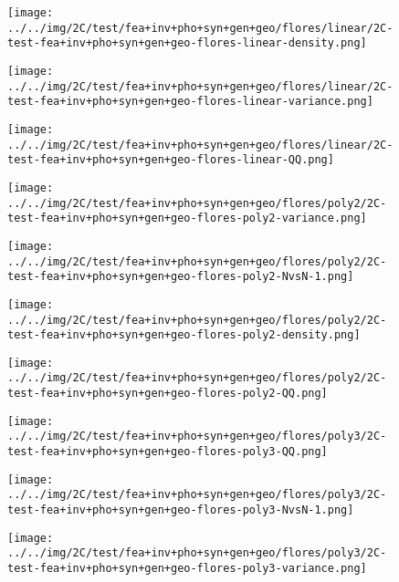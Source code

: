 \begin{figure}[H]
\centering	\texttt{[image: ../../img/2C/test/fea+inv+pho+syn+gen+geo/flores/linear/2C-test-fea+inv+pho+syn+gen+geo-flores-linear-density.png]}
\end{figure}
\begin{figure}[H]
\centering	\texttt{[image: ../../img/2C/test/fea+inv+pho+syn+gen+geo/flores/linear/2C-test-fea+inv+pho+syn+gen+geo-flores-linear-variance.png]}
\end{figure}
\begin{figure}[H]
\centering	\texttt{[image: ../../img/2C/test/fea+inv+pho+syn+gen+geo/flores/linear/2C-test-fea+inv+pho+syn+gen+geo-flores-linear-QQ.png]}
\end{figure}
\begin{figure}[H]
\centering	\texttt{[image: ../../img/2C/test/fea+inv+pho+syn+gen+geo/flores/poly2/2C-test-fea+inv+pho+syn+gen+geo-flores-poly2-variance.png]}
\end{figure}
\begin{figure}[H]
\centering	\texttt{[image: ../../img/2C/test/fea+inv+pho+syn+gen+geo/flores/poly2/2C-test-fea+inv+pho+syn+gen+geo-flores-poly2-NvsN-1.png]}
\end{figure}
\begin{figure}[H]
\centering	\texttt{[image: ../../img/2C/test/fea+inv+pho+syn+gen+geo/flores/poly2/2C-test-fea+inv+pho+syn+gen+geo-flores-poly2-density.png]}
\end{figure}
\begin{figure}[H]
\centering	\texttt{[image: ../../img/2C/test/fea+inv+pho+syn+gen+geo/flores/poly2/2C-test-fea+inv+pho+syn+gen+geo-flores-poly2-QQ.png]}
\end{figure}
\begin{figure}[H]
\centering	\texttt{[image: ../../img/2C/test/fea+inv+pho+syn+gen+geo/flores/poly3/2C-test-fea+inv+pho+syn+gen+geo-flores-poly3-QQ.png]}
\end{figure}
\begin{figure}[H]
\centering	\texttt{[image: ../../img/2C/test/fea+inv+pho+syn+gen+geo/flores/poly3/2C-test-fea+inv+pho+syn+gen+geo-flores-poly3-NvsN-1.png]}
\end{figure}
\begin{figure}[H]
\centering	\texttt{[image: ../../img/2C/test/fea+inv+pho+syn+gen+geo/flores/poly3/2C-test-fea+inv+pho+syn+gen+geo-flores-poly3-variance.png]}
\end{figure}
